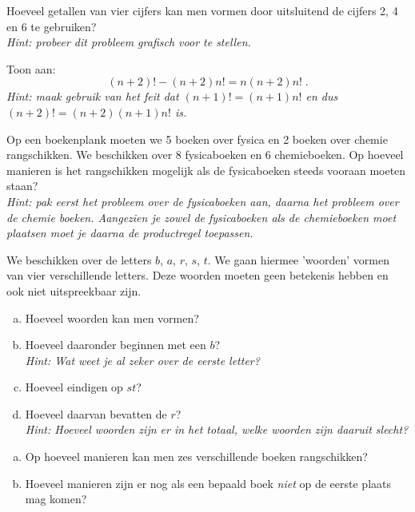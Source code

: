 \documentclass[12pt,twoside]{article}
\begin{document}
\begin{oefening}
Hoeveel getallen van vier cijfers kan men vormen door uitsluitend de cijfers 2, 4 en 6 te gebruiken?\\
{\em Hint: probeer dit probleem grafisch voor te stellen.}
\end{oefening}

\begin{oefening}
Toon aan: $$(n+2)!-(n+2)n!=n(n+2)n!\;.$$
{\em Hint: maak gebruik van het feit dat $(n+1)!=(n+1)n!$ en dus $(n+2)!=(n+2)(n+1)n!$ is.}
\end{oefening}

\begin{oefening}
Op een boekenplank moeten we 5 boeken over fysica en 2 boeken over chemie rangschikken. We beschikken over 8 fysicaboeken en 6 chemieboeken. Op hoeveel manieren is het rangschikken mogelijk als de fysicaboeken steeds vooraan moeten staan?\\
{\em Hint: pak eerst het probleem over de fysicaboeken aan, daarna het probleem over de chemie boeken. Aangezien je zowel de fysicaboeken als de chemieboeken moet plaatsen moet je daarna de productregel toepassen.}
\end{oefening}

\begin{oefening}
We beschikken over de letters $b$, $a$, $r$, $s$, $t$. We gaan hiermee 'woorden' vormen van vier verschillende letters. Deze woorden moeten geen betekenis hebben en ook niet uitspreekbaar zijn.
\begin{enumerate}[(a)]
  \item Hoeveel woorden kan men vormen?
  \item Hoeveel daaronder beginnen met een $b$?\\
  {\em Hint: Wat weet je al zeker over de eerste letter?}
  \item Hoeveel eindigen op $st$?
  \item Hoeveel daarvan bevatten de $r$?\\
  {\em Hint: Hoeveel woorden zijn er in het totaal, welke woorden zijn daaruit slecht?}
\end{enumerate}
\end{oefening}

\begin{oefening}
\begin{enumerate}[(a)]
  \item Op hoeveel manieren kan men zes verschillende boeken rangschikken?
  \item Hoeveel manieren zijn er nog als een bepaald boek {\em niet} op de eerste plaats mag komen?
\end{enumerate}

\end{oefening}
\end{document}
